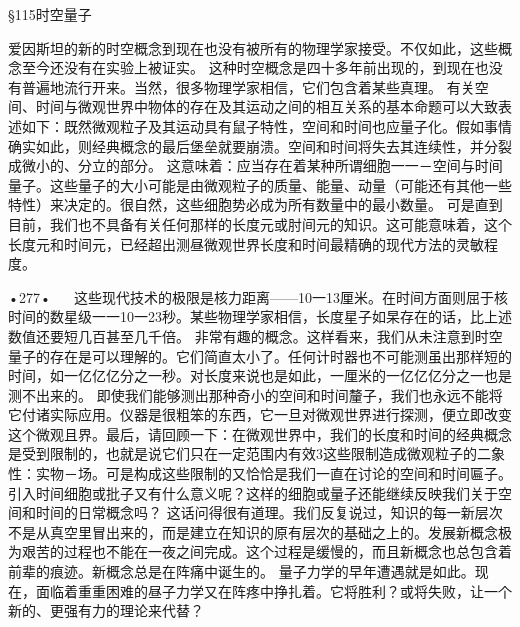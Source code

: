 §115时空量子

爱因斯坦的新的时空概念到现在也没有被所有的物理学家接受。不仅如此，这些概念至今还没有在实验上被证实。
这种时空概念是四十多年前出现的，到现在也没有普遍地流行开来。当然，很多物理学家相信，它们包含着某些真理。
有关空间、时间与微观世界中物体的存在及其运动之间的相互关系的基本命题可以大致表述如下：既然微观粒子及其运动具有鼠子特性，空间和时间也应量子化。假如事情确实如此，则经典概念的最后堡垒就要崩溃。空间和时间将失去其连续性，并分裂成微小的、分立的部分。
这意味着：应当存在着某种所谓细胞一一－空间与时间量子。这些量子的大小可能是由微观粒子的质量、能量、动量（可能还有其他一些特性）来决定的。很自然，这些细胞势必成为所有数量中的最小数量。
可是直到目前，我们也不具备有关任何那样的长度元或肘间元的知识。这可能意味着，这个长度元和时间元，已经超出测昼微观世界长度和时间最精确的现代方法的灵敏程度。

•277•
  
这些现代技术的极限是核力距离——10一13厘米。在时间方面则屈于核时间的数星级一一10一23秒。某些物理学家相信，长度星子如杲存在的话，比上述数值还要短几百甚至几千倍。
非常有趣的概念。这样看来，我们从未注意到时空量子的存在是可以理解的。它们简直太小了。任何计时器也不可能测虽出那样短的时间，如一亿亿亿分之一秒。对长度来说也是如此，一厘米的一亿亿亿分之一也是测不出来的。
即使我们能够测出那种奇小的空间和时间釐子，我们也永远不能将它付诸实际应用。仪器是很粗笨的东西，它一旦对微观世界进行探测，便立即改变这个微观且界。最后，请回顾一下：在微观世界中，我们的长度和时间的经典概念是受到限制的，也就是说它们只在一定范围内有效3这些限制造成微观粒子的二象性：实物－场。可是构成这些限制的又恰恰是我们一直在讨论的空间和时间匾子。
引入时间细胞或批子又有什么意义呢？这样的细胞或量子还能继续反映我们关于空间和时间的日常概念吗？
这话问得很有道理。我们反复说过，知识的每一新层次不是从真空里冒出来的，而是建立在知识的原有层次的基础之上的。发展新概念极为艰苦的过程也不能在一夜之间完成。这个过程是缓慢的，而且新概念也总包含着前辈的痕迹。新概念总是在阵痛中诞生的。
量子力学的早年遭遇就是如此。现在，面临着重重困难的昼子力学又在阵疼中挣扎着。它将胜利？或将失败，让一个新的、更强有力的理论来代替？
